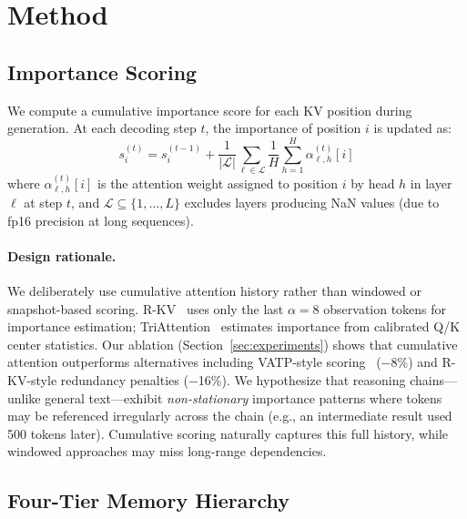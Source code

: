 \documentclass{article}
\begin{document}
\section{Method}
\label{sec:method}

\subsection{Importance Scoring}
\label{sec:scoring}

We compute a cumulative importance score for each KV position during generation.
At each decoding step $t$, the importance of position $i$ is updated as:
\begin{equation}
    s_i^{(t)} = s_i^{(t-1)} + \frac{1}{|\mathcal{L}|} \sum_{\ell \in \mathcal{L}} \frac{1}{H} \sum_{h=1}^{H} \alpha_{\ell,h}^{(t)}[i]
\end{equation}
where $\alpha_{\ell,h}^{(t)}[i]$ is the attention weight assigned to position $i$ by head $h$ in layer $\ell$ at step $t$, and $\mathcal{L} \subseteq \{1,\ldots,L\}$ excludes layers producing NaN values (due to fp16 precision at long sequences).

\paragraph{Design rationale.}
We deliberately use cumulative attention history rather than windowed or snapshot-based scoring.
R-KV~\cite{rkv} uses only the last $\alpha{=}8$ observation tokens for importance estimation; TriAttention~\cite{triattention} estimates importance from calibrated Q/K center statistics.
Our ablation (Section~\ref{sec:experiments}) shows that cumulative attention outperforms alternatives including VATP-style scoring~\cite{vatp} ($-$8\%) and R-KV-style redundancy penalties ($-$16\%).
We hypothesize that reasoning chains---unlike general text---exhibit \emph{non-stationary} importance patterns where tokens may be referenced irregularly across the chain (e.g., an intermediate result used 500 tokens later).
Cumulative scoring naturally captures this full history, while windowed approaches may miss long-range dependencies.

\subsection{Four-Tier Memory Hierarchy}
\label{sec:hierarchy}
\end{document}
